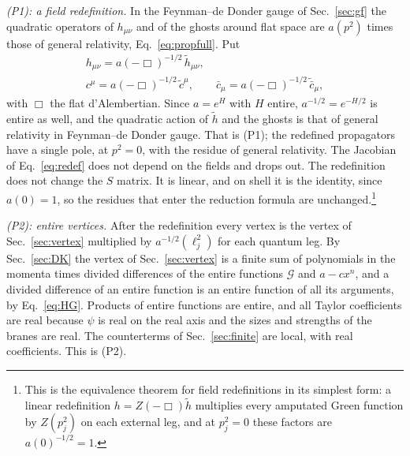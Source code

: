 \documentclass[a4paper,11pt]{article}
\begin{document}
\textit{(P1): a field redefinition.} In the Feynman--de Donder gauge of Sec.~\ref{sec:gf} the quadratic operators of $h_{\mu\nu}$ and of the ghosts around flat space are $a(p^2)$ times those of general relativity, Eq.~\eqref{eq:propfull}. Put
\begin{equation}
\label{eq:redef}
\begin{gathered}
h_{\mu\nu}=a(-\Box)^{-1/2}\,\tilde h_{\mu\nu},\\
c^\mu=a(-\Box)^{-1/2}\,\tilde c^\mu,\qquad \bar c_\mu=a(-\Box)^{-1/2}\,\tilde{\bar c}_\mu,
\end{gathered}
\end{equation}
with $\Box$ the flat d'Alembertian. Since $a=e^{H}$ with $H$ entire, $a^{-1/2}=e^{-H/2}$ is entire as well, and the quadratic action of $\tilde h$ and the ghosts is that of general relativity in Feynman--de Donder gauge. That is (P1); the redefined propagators have a single pole, at $p^2=0$, with the residue of general relativity. The Jacobian of Eq.~\eqref{eq:redef} does not depend on the fields and drops out. The redefinition does not change the $S$ matrix. It is linear, and on shell it is the identity, since $a(0)=1$, so the residues that enter the reduction formula are unchanged.\footnote{This is the equivalence theorem for field redefinitions in its simplest form: a linear redefinition $h=Z(-\Box)\tilde h$ multiplies every amputated Green function by $Z(p_j^2)$ on each external leg, and at $p_j^2=0$ these factors are $a(0)^{-1/2}=1$.}

\textit{(P2): entire vertices.} After the redefinition every vertex is the vertex of Sec.~\ref{sec:vertex} multiplied by $a^{-1/2}(\ell_j^2)$ for each quantum leg. By Sec.~\ref{sec:DK} the vertex of Sec.~\ref{sec:vertex} is a finite sum of polynomials in the momenta times divided differences of the entire functions $\mathcal G$ and $a-cx^n$, and a divided difference of an entire function is an entire function of all its arguments, by Eq.~\eqref{eq:HG}. Products of entire functions are entire, and all Taylor coefficients are real because $\psi$ is real on the real axis and the sizes and strengths of the branes are real. The counterterms of Sec.~\ref{sec:finite} are local, with real coefficients. This is (P2).
\end{document}
